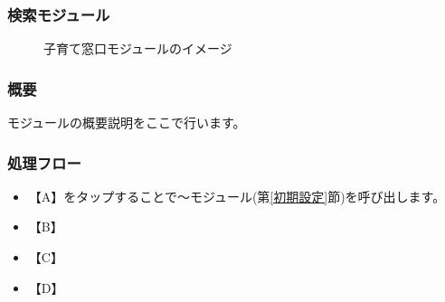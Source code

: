 \documentclass[a4j]{jarticle}
\begin{document}
\subsubsection{検索モジュール\label{検索}} %
\begin{figure}[H]
    \begin{center}
    \caption {子育て窓口モジュールのイメージ}
    \label{functionselection}
    \end{center}
\end{figure}
\subsubsection*{概要}
モジュールの概要説明をここで行います。
\subsubsection*{処理フロー}
\begin{itemize}
\item 【A】をタップすることで～モジュール(第\ref{初期設定}節)を呼び出します。%
\item 【B】
\item 【C】
\item 【D】
\end{itemize}
\end{document}
